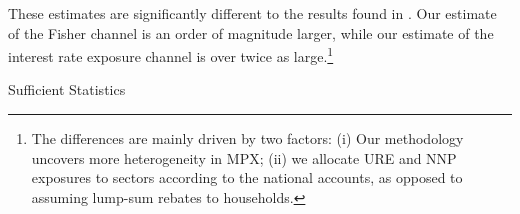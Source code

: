 \documentclass[titlepage]{\econtex}\newcommand{\texname}{ConsumptionHeterogeneity}
\begin{document}
	These estimates are significantly different to the results found in \cite{auclert_monetary_2017}. Our estimate of the Fisher channel is an order of magnitude larger, while our estimate of the interest rate exposure channel is over twice as large.\footnote{The differences are mainly driven by two factors: (i) Our methodology uncovers more heterogeneity in MPX; (ii) we allocate URE and NNP exposures to sectors according to the national accounts, as opposed to assuming lump-sum rebates to households.}
	\begin{center}
		\begin{table}
			\caption{Sufficient Statistics}
			\label{table:suff_stats}
			\begin{center}
				
			\end{center}
		\end{table}
	\end{center}
	\begin{comment}
	A long outstanding question in monetary economics is why monetary policy acts with a lag. Two competing theories are habits models such as \cite{fuhrer_habit_2000} and sticky information models such as \cite{mankiw_sticky_2002}. \cite{carroll_sticky_2018} find evidence toward the idea that households react fast to their own idiosyncratic income shocks, but news about macroeconomic shocks takes time to be absorbed. A possible third alternative to both of these theories is that households respond strongly to their realized income today, but not to income anticipated in the future. As it takes time for variable rate mortgages to reset (typically from six months up to five years in Denmark), this would result in the interest rate exposure channel acting with a delay. Indeed, the literature on consumption responses to transitory income shocks has generally found little difference between anticipated and unanticipated responses. Many of the estimates in table \ref{table:MPCLiterature} use anticipated shocks (such as tax rebates) as an instrument and find large MPCs, suggesting households do not necessarily pay attention to anticipated cash flows until they arrive. \cite{ganong_consumer_2017} show this very clearly: there is a sharp consumption drop in the month that unemployment benefits expire, an entirely anticipated event. A model that takes these results seriously, along with a large role for the interest rate exposure channel of monetary policy, could be a fruitful area for future research. 
	\end{comment}
	
\end{document}
